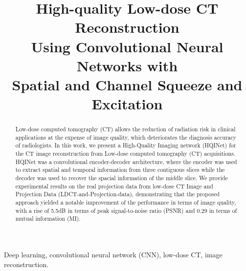 \documentclass[conference]{IEEEtran}
\makeatletter
\def\blfootnote{\xdef\@thefnmark{}\@footnotetext}
\makeatother
\begin{document}
\title{High-quality Low-dose CT Reconstruction \\Using Convolutional Neural Networks with \\Spatial and Channel Squeeze and Excitation}

\author{

}
\maketitle
\blfootnote{* indicates equal contribution}

\begin{abstract}
Low-dose computed tomography (CT) allows the reduction of radiation risk in clinical applications at the expense of image quality, which deteriorates the diagnosis accuracy of radiologists. In this work, we present a High-Quality Imaging network (HQINet) for the CT image reconstruction from Low-dose computed tomography (CT) acquisitions. HQINet was a convolutional encoder-decoder architecture, where the encoder was used to extract spatial and temporal information from three contiguous slices while the decoder was used to recover the spacial information of the middle slice. We provide experimental results on the real projection data from low-dose CT Image and Projection Data (LDCT-and-Projection-data), demonstrating that the proposed approach yielded a notable improvement of the performance in terms of image quality, with a rise of 5.5dB in terms of peak signal-to-noise ratio (PSNR) and 0.29 in terms of mutual information (MI).
\end{abstract}

\begin{IEEEkeywords}
Deep learning, convolutional neural network (CNN), low-dose CT, image reconstruction.
\end{IEEEkeywords}
\end{document}

